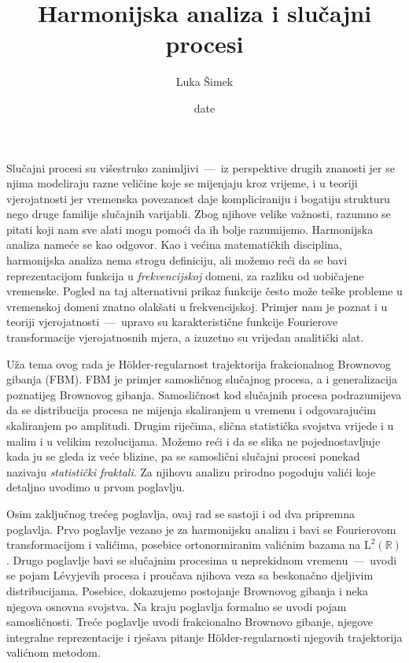 \documentclass[a4paper,oneside,12pt]{memoir}
\title{Harmonijska analiza i slu\v{c}ajni procesi}
\author{Luka Šimek}
\date{date}
\numberwithin{teorem}{section}
\numberwithin{equation}{chapter}
\numberwithin{figure}{chapter}
\numberwithin{table}{chapter}
\newcommand{\R}{\mathbb{R}}
\newcommand{\holder}{H\" older}
\newcommand{\levy}{L\' evy}
\def\L{\mathrm{L}}
\begin{document}
\frontmatter

\begin{intro}
	Slučajni procesi su višestruko zanimljivi~---~iz perspektive drugih znanosti jer
	se njima modeliraju razne veličine koje se mijenjaju kroz vrijeme, i u teoriji vjerojatnosti
	jer vremenska povezanost daje kompliciraniju i bogatiju strukturu nego druge familije slučajnih varijabli.
	Zbog njihove velike važnosti, razumno se pitati koji nam
	sve alati mogu pomoći da ih bolje razumijemo. Harmonijska analiza nameće se kao odgovor.
	Kao i većina matematičkih disciplina, harmonijska analiza nema strogu definiciju, ali
	možemo reći da se bavi reprezentacijom funkcija u \emph{frekvencijskoj} domeni, za razliku
	od uobičajene vremenske. Pogled na taj alternativni prikaz funkcije često može teške
	probleme u vremenskoj domeni znatno olakšati u frekvencijskoj. Primjer nam
	je poznat i u teoriji vjerojatnosti~---~upravo su karakteristične funkcije Fourierove transformacije
	vjerojatnosnih mjera, a izuzetno su vrijedan analitički alat.

	Uža tema ovog rada je \holder -regularnost trajektorija frakcionalnog Brownovog gibanja (FBM).
	FBM je primjer samosličnog slučajnog procesa, a i generalizacija poznatijeg Brownovog gibanja. Samosličnost kod slučajnih procesa
	podrazumijeva da se distribucija procesa ne mijenja skaliranjem u vremenu i odgovarajućim skaliranjem po amplitudi. Drugim riječima, slična statistička svojstva
	vrijede i u malim i u velikim rezolucijama.
	Možemo reći i da se slika ne pojednostavljuje kada ju se gleda iz veće blizine, pa se
	samoslični slučajni procesi ponekad nazivaju \emph{statistički fraktali}.
	Za njihovu analizu prirodno pogoduju valići koje detaljno uvodimo u prvom poglavlju.%

	Osim zaključnog trećeg poglavlja, ovaj rad se sastoji i od dva pripremna poglavlja.
	Prvo poglavlje vezano je za harmonijsku analizu i bavi se Fourierovom transformacijom
	i valićima, posebice ortonormiranim valićnim bazama na \( \L^2(\R) \).
	Drugo poglavlje bavi se slučajnim procesima u neprekidnom vremenu~---~uvodi se pojam \levy jevih
	procesa i proučava njihova veza sa beskonačno djeljivim distribucijama. Posebice, dokazujemo
	postojanje Brownovog gibanja i neka njegova osnovna svojstva. Na kraju poglavlja formalno se uvodi pojam samosličnosti.
	Treće poglavlje uvodi frakcionalno Brownovo gibanje, njegove integralne reprezentacije i
	rješava pitanje \holder -regularnosti njegovih trajektorija valićnom metodom.


\end{intro}
\end{document}
